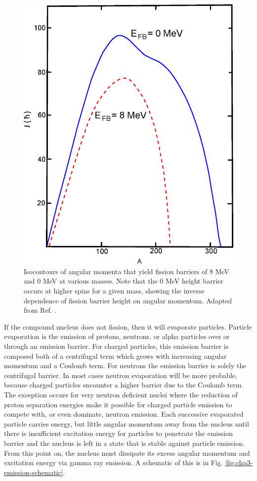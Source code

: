 \begin{figure}[h!]
	\centerline{\includegraphics[height=0.3\textheight]{./img/c3/fission_barrier.eps}}
	\caption{Isocontours of angular momenta that yield fission barriers of $8$ MeV and $0$ MeV at various masses. Note that the $0$ MeV height barrier occurs at higher spins for a given mass, showing the inverse dependence of fission barrier height on angular momentum. Adapted from Ref. \cite{fissionBarrier2}.\label{fig:chp3-fission-barrier}}
\end{figure}

If the compound nucleus does not fission, then it will evaporate particles. Particle evaporation is the emission of protons, neutrons, or alpha particles over or through an emission barrier. For charged particles, this emission barrier is composed both of a centrifugal term which grows with increasing angular momentum and a Coulomb term. For neutrons the emission barrier is solely the centrifugal barrier. In most cases neutron evaporation will be more probable, because charged particles encounter a higher barrier due to the Coulomb term. The exception occurs for very neutron deficient nuclei where the reduction of proton separation energies make it possible for charged particle emission to compete with, or even dominate, neutron emission. Each successive evaporated particle carries energy, but little angular momentum away from the nucleus until there is insufficient excitation energy for particles to penetrate the emission barrier and the nucleus is left in a state that is stable against particle emission. From this point on, the nucleus must dissipate its excess angular momentum and excitation energy via gamma ray emission. A schematic of this is in Fig. \ref{fig:chp3-emission-schematic}.

